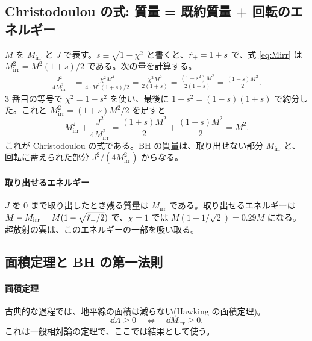 \subsection{Christodoulou の式: 質量 = 既約質量 + 回転のエネルギー}

$M$ を $M_\mathrm{irr}$ と $J$ で表す。$s\equiv\sqrt{1-\chi^2}$ と書くと、$\tilde r_+=1+s$ で、式 \eqref{eq:Mirr} は $M_\mathrm{irr}^2=M^2(1+s)/2$ である。次の量を計算する。
\begin{align}
\frac{J^2}{4M_\mathrm{irr}^2}
&=\frac{\chi^2M^4}{4\cdot M^2(1+s)/2}=\frac{\chi^2M^2}{2(1+s)}
=\frac{(1-s^2)M^2}{2(1+s)}=\frac{(1-s)M^2}{2}.
\end{align}
3 番目の等号で $\chi^2=1-s^2$ を使い、最後に $1-s^2=(1-s)(1+s)$ で約分した。これと $M_\mathrm{irr}^2=(1+s)M^2/2$ を足すと
\begin{equation}
M_\mathrm{irr}^2+\frac{J^2}{4M_\mathrm{irr}^2}=\frac{(1+s)M^2}{2}+\frac{(1-s)M^2}{2}=M^2.
\label{eq:christodoulou}
\end{equation}
これが Christodoulou の式である。BH の質量は、取り出せない部分 $M_\mathrm{irr}$ と、回転に蓄えられた部分 $J^2/(4M_\mathrm{irr}^2)$ からなる。

\paragraph{取り出せるエネルギー}
$J$ を 0 まで取り出したとき残る質量は $M_\mathrm{irr}$ である。取り出せるエネルギーは $M-M_\mathrm{irr}=M(1-\sqrt{\tilde r_+/2})$ で、$\chi=1$ では $M(1-1/\sqrt2)=0.29M$ になる。超放射の雲は、このエネルギーの一部を吸い取る。

\subsection{面積定理と BH の第一法則}

\paragraph{面積定理}
古典的な過程では、地平線の面積は減らない(Hawking の面積定理)。
\begin{equation}
\dd A\ge0\quad\Longleftrightarrow\quad\dd M_\mathrm{irr}\ge0.
\label{eq:areatheorem}
\end{equation}
これは一般相対論の定理で、ここでは結果として使う。

